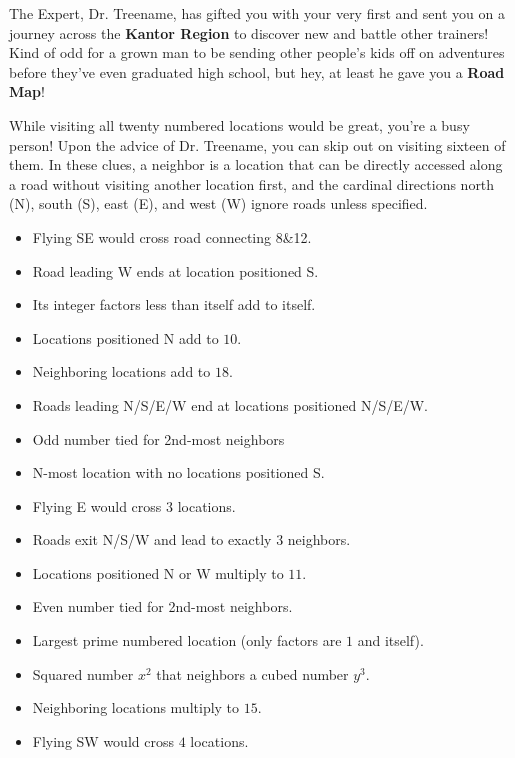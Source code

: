 

The \mappMobimon{} Expert, Dr. Treename, has gifted you with your very
first \mappMobimon{} and sent you on a journey across the
\textbf{Kantor Region} to discover new \mappMobimon{} and battle other
trainers! Kind of odd for a grown man to be sending other people's kids off
on adventures before they've even graduated high school, but hey, at least he
gave you a \textbf{Road Map}!

While visiting all twenty numbered locations would be great, you're a
busy person! Upon the advice of Dr. Treename, you can skip out on visiting
sixteen of them. In these clues, a neighbor is a location that can be
directly accessed along a road without visiting another location first, and the
cardinal directions north (N), south (S), east (E), and west (W) ignore
roads unless specified.

\begin{multicols}{2}
  \begin{itemize}
    \item Flying SE would cross road connecting 8\&12. %
    \item Road leading W ends at location positioned S. %
    \item Its integer factors less than itself add to itself. %
    \item Locations positioned N add to \(10\). %
    \item Neighboring locations add to \(18\). %
    \item Roads leading N/S/E/W end at locations positioned N/S/E/W. %
    \item Odd number tied for 2nd-most neighbors %
    \item N-most location with no locations positioned S. %
    \item Flying E would cross \(3\) locations. %
    \item Roads exit N/S/W and lead to exactly \(3\) neighbors. %
    \item Locations positioned N or W multiply to \(11\). %
    \item Even number tied for 2nd-most neighbors. %
    \item Largest prime numbered location (only factors are \(1\) and itself). %
    \item Squared number \(x^2\) that neighbors a cubed number \(y^3\). %
    \item Neighboring locations multiply to \(15\). %
    \item Flying SW would cross \(4\) locations. %
  \end{itemize}
\end{multicols}

